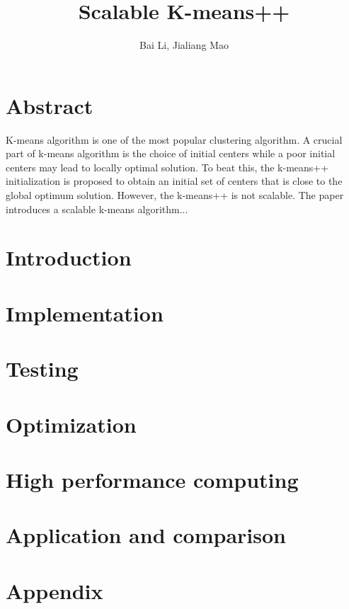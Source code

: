 \documentclass{statsoc}
\title[Short title]{Scalable K-means++}
\author[ {\it et al.}]{Bai Li, Jialiang Mao}
\begin{document}
  
\section*{Abstract}
K-means algorithm is one of the most popular clustering algorithm. A crucial part of k-means algorithm is the choice of initial centers while a poor initial centers may lead to locally optimal solution. To beat this, the k-means++ initialization is proposed to obtain an initial set of centers that is close to the global optimum solution. However, the k-means++ is not scalable. The paper introduces a scalable k-means algorithm...

  
\section{Introduction}






\section{Implementation}


\section{Testing}

\section{Optimization}

\section{High performance computing}

\section{Application and comparison}
\clearpage
\newpage




\section*{Appendix}
\clearpage
\newpage
\end{document}
